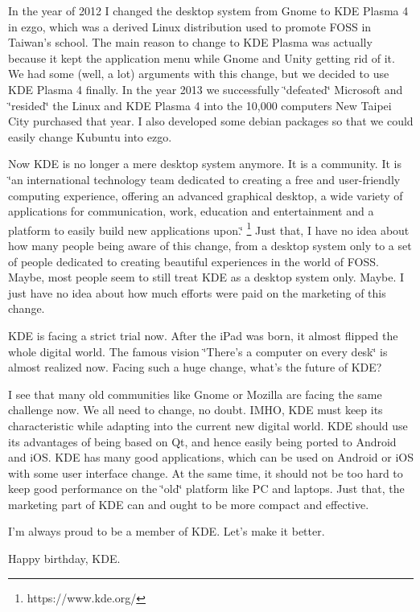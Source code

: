 In the year of 2012 I changed the desktop system from Gnome to KDE
Plasma 4 in ezgo, which was a derived Linux distribution used to promote
FOSS in Taiwan's school. The main reason to change to KDE Plasma was
actually because it kept the application menu while Gnome and Unity
getting rid of it. We had some (well, a lot) arguments with this change,
but we decided to use KDE Plasma 4 finally. In the year 2013 we successfully
\char`\"{}defeated\char`\"{} Microsoft and \char`\"{}resided\char`\"{}
the Linux and KDE Plasma 4 into the 10,000 computers New Taipei City
purchased that year. I also developed some debian packages so that
we could easily change Kubuntu into ezgo. 

Now KDE is no longer a mere desktop system anymore. It is a community.
It is \char`\"{}an international technology team dedicated to creating
a free and user-friendly computing experience, offering an advanced
graphical desktop, a wide variety of applications for communication,
work, education and entertainment and a platform to easily build new
applications upon.\char`\"{}%
\footnote{https://www.kde.org/%
} Just that, I have no idea about how many people being aware of this
change, from a desktop system only to a set of people dedicated to
creating beautiful experiences in the world of FOSS. Maybe, most people
seem to still treat KDE as a desktop system only. Maybe. I just have
no idea about how much efforts were paid on the marketing of this
change. 

KDE is facing a strict trial now. After the iPad was born, it almost
flipped the whole digital world. The famous vision \char`\"{}There's
a computer on every desk\char`\"{} is almost realized now. Facing
such a huge change, what's the future of KDE?

I see that many old communities like Gnome or Mozilla are facing the
same challenge now. We all need to change, no doubt. IMHO, KDE must
keep its characteristic while adapting into the current new digital
world. KDE should use its advantages of being based on Qt, and hence
easily being ported to Android and iOS. KDE has many good applications,
which can be used on Android or iOS with some user interface change.
At the same time, it should not be too hard to keep good performance
on the \char`\"{}old\char`\"{} platform like PC and laptops. Just
that, the marketing part of KDE can and ought to be more compact and
effective.

I'm always proud to be a member of KDE. Let's make it better.

Happy birthday, KDE.